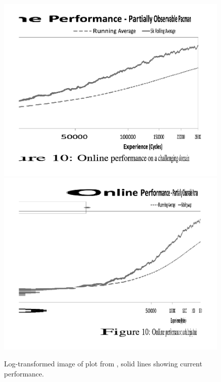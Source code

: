 \documentclass{article}
\begin{document}
\begin{flushleft}
\begin{figure}
\includegraphics[width=\textwidth]{jvlg1002.png}
\includegraphics[width=\textwidth]{jvlg1005.png}
\caption{
Log-transformed image of plot from \cite{orig}\label{fig:jvl},
solid lines showing current performance.
}
\end{figure}

%


\end{flushleft}
\end{document}
